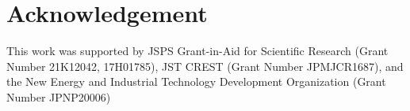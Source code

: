\documentclass[sigconf,natbib=false]{acmart}
\begin{document}
\begin{table}[h!]
\centering
\caption{Hyperparameters for the ogbn-paper100M dataset}
\label{tab:ogbn_papers}
\end{table}


\section*{Acknowledgement}

This work was supported by JSPS Grant-in-Aid for Scientific Research (Grant Number 21K12042, 17H01785), JST CREST (Grant Number JPMJCR1687), and the New Energy and Industrial Technology Development Organization (Grant Number JPNP20006)

\printbibliography

\appendix
\end{document}
